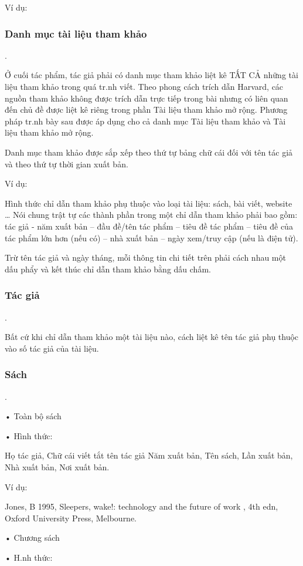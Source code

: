 \documentclass{hcmutarticle}
\begin{document}
Ví dụ:


\subsubsection{Danh mục tài liệu tham khảo}.

Ở cuối tác phẩm, tác giả phải có danh mục tham khảo liệt kê TẤT CẢ những tài liệu tham khảo trong quá tr.nh viết. Theo phong cách trích dẫn Harvard, các nguồn tham khảo không được trích dẫn trực tiếp trong bài nhưng có liên quan đến chủ đề được liệt kê riêng trong phần Tài liệu tham khảo mở rộng. Phương pháp tr.nh bày sau được áp dụng cho cả danh mục Tài liệu tham khảo và Tài liệu tham khảo mở rộng.

Danh mục tham khảo được sắp xếp theo thứ tự bảng chữ cái đối với tên tác giả và
theo thứ tự thời gian xuất bản.

Ví dụ:

Hình thức chỉ dẫn tham khảo phụ thuộc vào loại tài liệu: sách, bài viết, website … Nói chung trật tự các thành phần trong một chỉ dẫn tham khảo phải bao gồm: tác giả - năm xuất bản – đầu đề/tên tác phẩm – tiêu đề tác phẩm – tiêu đề của tác
phẩm lớn hơn (nếu có) – nhà xuất bản – ngày xem/truy cập (nếu là điện tử). 


Trừ tên tác giả và ngày tháng, mỗi thông tin chi tiết trên phải cách nhau một dấu phẩy và kết thúc chỉ dẫn tham khảo bằng dấu chấm. 

\subsubsection{Tác giả}.

Bất cứ khi chỉ dẫn tham khảo một tài liệu nào, cách liệt kê tên tác giả phụ thuộc vào số tác giả của tài liệu.

\subsubsection{Sách}.

•	Toàn bộ sách

•	Hình thức:

Họ tác giả, Chữ cái viết tắt tên tác giả Năm xuất bản, Tên sách, Lần xuất bản, Nhà xuất bản, Nơi xuất bản.

Ví dụ:

Jones, B 1995, Sleepers, wake!: technology and the future of work , 4th edn, Oxford University Press, Melbourne.

•	Chương sách

•	H.nh thức:
\end{document}
